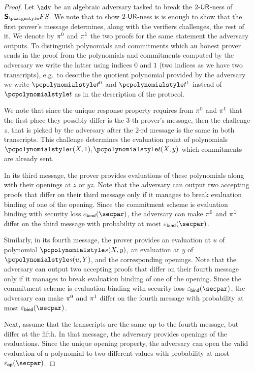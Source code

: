 \begin{proof}
  Let $\adv$ be an algebraic adversary tasked to break the ${2\text{-}\mathsf{UR}}$-ness of
  $\sonicprotfs$. We note that to show ${2\text{-}\mathsf{UR}}$-ness is is enough to show that the first prover's message determines, along with the verifiers challenges, the rest of it. 
  We denote by $\pi^0$ and $\pi^1$ the two proofs for the same statement the adversary outputs.
  To distinguish polynomials and commitments which an honest prover sends in the
  proof from the polynomials and commitments computed by the adversary we write the latter using indices $0$ and $1$ (two indices as we have two transcripts), e.g.~to describe the quotient polynomial provided by the adversary we write $\p{t}^0$ and   $\p{t}^1$ instead of $\p{t}$ as in the description of the protocol.

  We note that since the unique response property requires from $\pi^{0}$ and $\pi^{1}$ that the first place they possibly differ is the $3$-th prover's message, then the challenge $z$, that is picked by the adversary after the $2$-rd message is the same in both transcripts. This challenge determines the evaluation point of polynomials $\p{r}(X, 1), \p{t}(X, y)$ which commitments are already sent.

  In its third message, the prover provides evaluations of these polynomials along with their openings at $z$ or $yz$. Note that the adversary can output two accepting proofs that differ on their third message only if it  manages to break evaluation binding of one of the opening. Since the commitment scheme is evaluation binding with security loss $\epsbinding (\secpar)$, the adversary can make $\pi^{0}$ and $\pi^{1}$ differ on the third message with probability at most $\epsbinding (\secpar) $. 

  Similarly, in its fourth message, the prover provides an evaluation at $u$ of polynomial $\p{s}(X, y)$, an evaluation at $y$ of $\p{s} (u, Y)$, and the corresponding openings. Note that the adversary can output two accepting proofs that differ on their fourth message only if it manages to break evaluation binding of one of the opening. Since the commitment scheme is evaluation binding with security loss $\epsbinding (\secpar)$, the adversary can make $\pi^{0}$ and $\pi^{1}$ differ on the fourth message with probability at most $\epsbinding (\secpar) $. 

  Next, assume that the transcripts are the same up to the fourth message, but differ at the fifth. In that message, the adversary provides openings of the evaluations. Since the unique opening property, the adversary can open the valid evaluation of a polynomial to two different values with probability at most $\epsop (\secpar)$.%


\end{proof}
